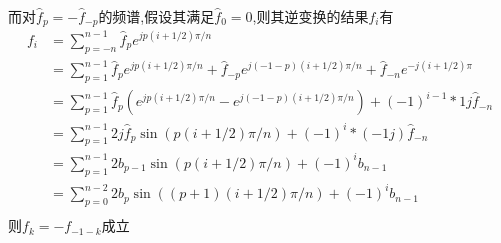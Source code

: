 \documentclass[UTF8]{ctexart}
\begin{document}
而对$\hat{f}_p=-\hat{f}_{-p}$的频谱,假设其满足$\hat{f}_{0}=0$,则其逆变换的结果$f_i$有
\begin{equation*}
  \begin{split}
     f_{i}          &= \sum\limits_{p=-n}^{n-1} \hat{f}_{p} e^{jp(i+1/2)\pi/n} \\
                    &= \sum\limits_{p=1}^{n-1} \hat{f}_{p} e^{jp(i+1/2)\pi/n}+\hat{f}_{-p}e^{j(-1-p)(i+1/2)\pi/n} + \hat{f}_{-n}e^{-j(i+1/2)\pi}  \\
                    &= \sum\limits_{p=1}^{n-1} \hat{f}_{p} (e^{jp(i+1/2)\pi/n}-e^{j(-1-p)(i+1/2)\pi/n}) + (-1)^{i-1}*1j\hat{f}_{-n}\\
                    &= \sum\limits_{p=1}^{n-1} 2j\hat{f}_{p} \sin(p(i+1/2)\pi/n)+ (-1)^{i}*(-1j)\hat{f}_{-n} \\
                    &= \sum\limits_{p=1}^{n-1} 2b_{p-1} \sin(p(i+1/2)\pi/n)+  (-1)^{i}b_{n-1}\\
                    &= \sum\limits_{p=0}^{n-2} 2b_{p} \sin((p+1)(i+1/2)\pi/n)+  (-1)^{i}b_{n-1}\\
  \end{split}
\end{equation*}
则$f_{k}=-f_{-1-k}$成立
\end{document}
